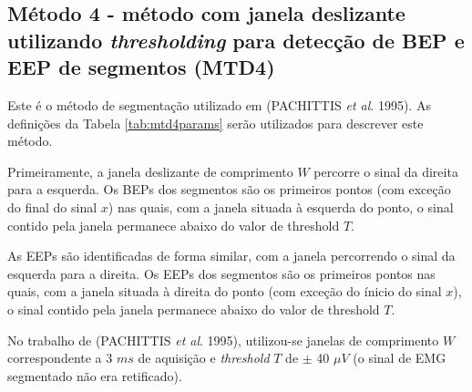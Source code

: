 
\subsection{Método 4 - método com janela deslizante utilizando \emph{thresholding} para detecção de BEP e EEP de segmentos  (MTD4)}

Este é o método de segmentação utilizado em (PACHITTIS \emph{et al}. 1995). As definições da Tabela \ref{tab:mtd4params} serão utilizados para descrever este método.

\begin{table}[htb]
\end{table}

Primeiramente, a janela deslizante de comprimento $W$ percorre o sinal da direita para a esquerda. Os BEPs dos segmentos são os primeiros pontos (com exceção do final do sinal $x$) nas quais, com a janela situada à esquerda do ponto, o sinal contido pela janela permanece abaixo do valor de threshold $T$.

As EEPs são identificadas de forma similar, com a janela percorrendo o sinal da esquerda para a direita. Os EEPs dos segmentos são os primeiros pontos nas quais, com a janela situada à direita do ponto (com exceção do ínicio do sinal $x$), o sinal contido pela janela permanece abaixo do valor de threshold $T$.

No trabalho de (PACHITTIS \emph{et al}. 1995), utilizou-se janelas de comprimento $W$ correspondente a 3 $ms$ de aquisição e \emph{threshold} $T$ de $\pm$ 40 $\mu V$ (o sinal de EMG segmentado não era retificado).


